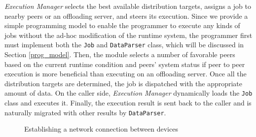 \documentclass{sig-alternate}
\begin{document}
\emph{Execution Manager} selects the best available distribution targets, assigns a job to nearby peers or an offloading server, and steers its execution. Since we provide a simple programming model to enable the programmer to execute any kinds of jobs without the ad-hoc modification of the runtime system, the programmer first must implement both the \texttt{Job} and \texttt{DataParser} class, which will be discussed in Section \ref{prog_model}. Then, the module selects a number of favorable peers based on the current runtime condition and peers' system status if peer to peer execution is more beneficial than executing on an offloading server. Once all the distribution targets are determined, the job is dispatched with the appropriate amount of data. On the caller side, \emph{Execution Manager} dynamically loads the \texttt{Job} class and executes it. Finally, the execution result is sent back to the caller and is naturally migrated with other results by \texttt{DataParser}.

\begin{figure} [!tbh]
	\centering
	\caption{Establishing a network connection between devices}
	\label{fig:forming}
\end{figure}
\end{document}
